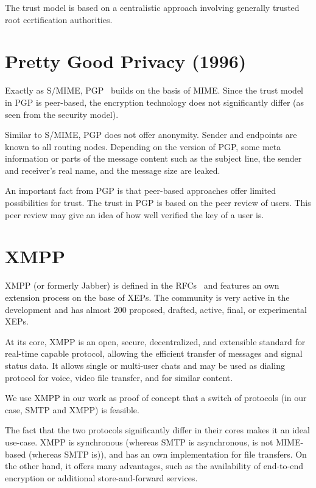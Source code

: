 The trust model is based on a centralistic approach involving generally trusted root certification authorities.

\section{Pretty Good Privacy (1996)}
Exactly as S/MIME, PGP~\cite{rfc4880} builds on the basis of MIME. Since the trust model in PGP is peer-based, the encryption technology does not significantly differ (as seen from the security model).

Similar to S/MIME, PGP does not offer anonymity. Sender and endpoints are known to all routing nodes. Depending on the version of PGP, some meta information or parts of the message content such as the subject line, the sender and receiver's real name, and the message size are leaked.

An important fact from PGP is that peer-based approaches offer limited possibilities for trust. The trust in PGP is based on the peer review of users. This peer review may give an idea of how well verified the key of a user is.

\section{XMPP}
XMPP (or formerly Jabber) is defined in the RFCs~\cite{rfc6120,rfc6121,rfc3923,rfc3922} and features an own extension process on the base of XEPs. The community is very active in the development and has almost 200 proposed, drafted, active, final, or experimental XEPs. 

At its core, XMPP is an open, secure, decentralized, and extensible standard for real-time capable protocol, allowing the efficient transfer of messages and signal status data. It allows single or multi-user chats and may be used as dialing protocol for voice, video file transfer, and for similar content.

We use XMPP in our work as proof of concept that a switch of protocols (in our case, SMTP and XMPP) is feasible.

The fact that the two protocols significantly differ in their cores makes it an ideal use-case. XMPP is synchronous (whereas SMTP is asynchronous, is not MIME-based (whereas SMTP is)), and has an own implementation for file transfers. On the other hand, it offers many advantages, such as the availability of end-to-end encryption or additional store-and-forward services.


